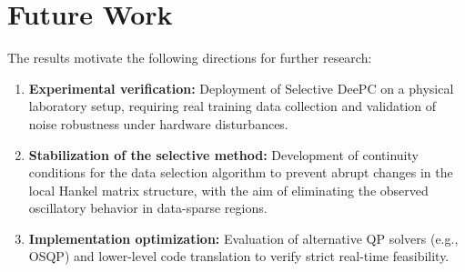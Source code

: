 \section{Future Work}

The results motivate the following directions for further research:

\begin{enumerate}
    \item \textbf{Experimental verification:} Deployment of Selective DeePC on a physical laboratory setup, requiring real training data collection and validation of noise robustness under hardware disturbances.
    \item \textbf{Stabilization of the selective method:} Development of continuity conditions for the data selection algorithm to prevent abrupt changes in the local Hankel matrix structure, with the aim of eliminating the observed oscillatory behavior in data-sparse regions.
    \item \textbf{Implementation optimization:} Evaluation of alternative QP solvers (e.g., OSQP) and lower-level code translation to verify strict real-time feasibility.
\end{enumerate}